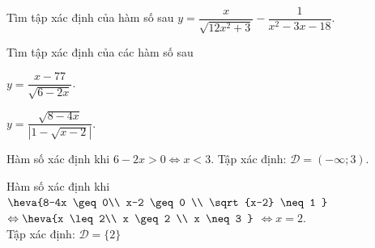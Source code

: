 \begin{bt}%
	Tìm tập xác định của hàm số sau $y=\dfrac{x}{\sqrt{12 x^2+3}}-\dfrac{1}{x^2-3x-18}$.
\end{bt}

\begin{bt}%
	Tìm tập xác định của các hàm số sau
	\begin{listEX}[2]
		\item $y=\dfrac{x-77}{\sqrt{6-2x}}$.
		\item $y=\dfrac{\sqrt{8-4x}}{\left|1-\sqrt{x-2}\right|}$.
	\end{listEX}
\loigiai
{
	\begin{listEX}
		\item Hàm số xác định khi $6-2x > 0 \Leftrightarrow x < 3$. Tập xác định: $\mathscr{D}=(-\infty; 3)$.
		\item Hàm số xác định khi $\heva{8-4x \geq 0\\ x-2 \geq 0 \\ \sqrt{x-2} \neq 1 }$ $\Leftrightarrow  \heva{x \leq 2\\ x \geq 2 \\ x \neq 3 }$ $\Leftrightarrow x=2$.\\
		Tập xác định: $\mathscr{D}=\big\{2\big\}$
	\end{listEX}
}
\end{bt}

